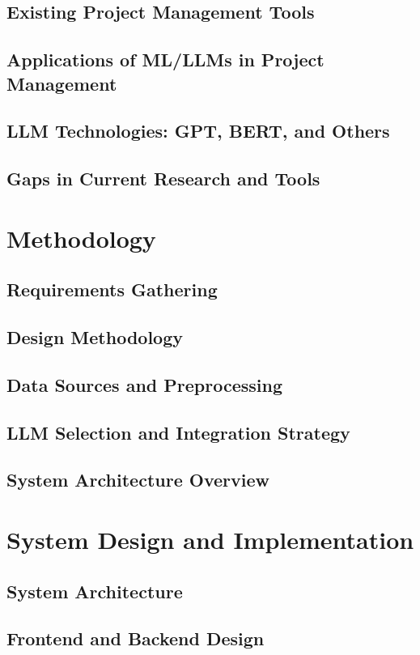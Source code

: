 \documentclass[12pt,a4paper]{report}
\begin{document}
\section{Existing Project Management Tools}
\section{Applications of ML/LLMs in Project Management}
\section{LLM Technologies: GPT, BERT, and Others}
\section{Gaps in Current Research and Tools}

\chapter{Methodology}  %
\section{Requirements Gathering}
\section{Design Methodology}
\section{Data Sources and Preprocessing}
\section{LLM Selection and Integration Strategy}
\section{System Architecture Overview}

\chapter{System Design and Implementation}  %
\section{System Architecture}
\section{Frontend and Backend Design}
\end{document}
